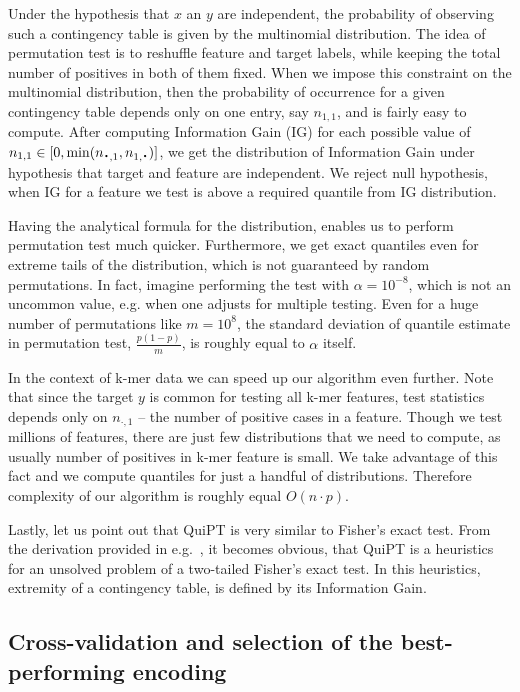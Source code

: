 \documentclass[a4,center,fleqn]{NAR}
\newcommand*{\bigcdot}{\raisebox{-0.25ex}{\scalebox{1.5}{$\cdot$}}}
\begin{document}
  Under the hypothesis that $x$ an $y$ are independent, the probability of 
observing such a contingency table is given by the multinomial distribution. The 
idea of permutation test is to reshuffle feature and target labels, while 
keeping the total number of positives in both of them fixed. When we impose this 
constraint on the multinomial distribution, then the probability of occurrence 
for a given contingency table depends only on one entry, say $n_{1,1}$, and is 
fairly easy to compute. After computing Information Gain (IG) for each possible 
value of $n_{1,1} \in [0,\min(n_{\bigcdot, 1}, n_{1, \bigcdot})]$, we get the 
distribution of Information Gain under hypothesis that target and feature are 
independent. We reject null hypothesis, when IG for a feature we test is above a 
required quantile from IG distribution.

  Having the analytical formula for the distribution, enables us to perform 
permutation test much quicker. Furthermore, we get exact quantiles even for 
extreme tails of the distribution, which is not guaranteed by random 
permutations. In fact, imagine performing the test with $\alpha=10^{-8}$, which 
is not an uncommon value, e.g. when one adjusts for multiple testing. Even for a 
huge number of permutations like $m=10^8$, the standard deviation of quantile 
estimate in permutation test, $\frac{p(1-p)}{m}$, is roughly equal to $\alpha$ 
itself.

  In the context of k-mer data we can speed up our algorithm even further. Note 
that since the target $y$ is common for testing all k-mer features, test 
statistics depends only on $n_{\cdot, 1}$ -- the number of positive cases in a 
feature. Though we test millions of features, there are just few distributions 
that we need to compute, as usually number of positives in k-mer feature is 
small. We take advantage of this fact and we compute quantiles for just a 
handful of distributions. Therefore complexity of our algorithm is roughly equal 
$O(n\cdot p)$.

  Lastly, let us point out that QuiPT is very similar to Fisher's exact test. 
From the derivation provided in e.g.~\citep{lehmann_testing_2008}, it becomes 
obvious, that QuiPT is a heuristics for an unsolved problem of a two-tailed 
Fisher's exact test. In this heuristics, extremity of a contingency table, is 
defined by its Information Gain.

\subsection{Cross-validation and selection of the best-performing encoding}
\end{document}
